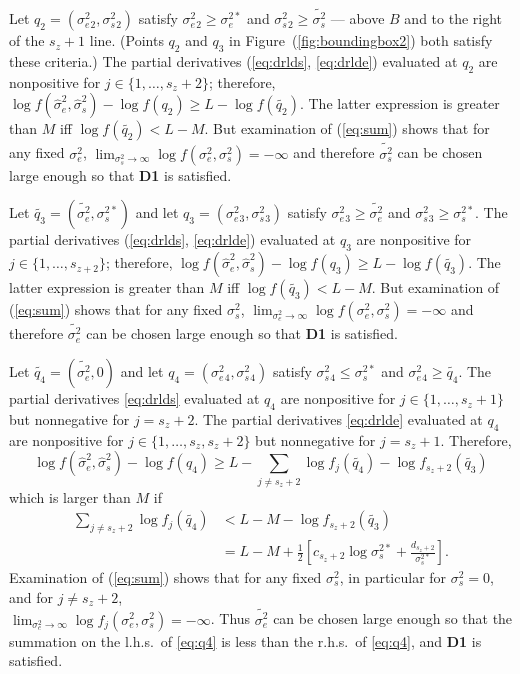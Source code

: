 \documentclass{report}
\newcommand{\RL}{f}
\newcommand{\logRL}{\log\RL}
\newcommand{\sigssq}{\sigma_s^2}
\newcommand{\sigesq}{\sigma_e^2}
\newcommand{\sshat}{\hat\sigma^2_e,\hat\sigma^2_s}
\newcommand{\logRLss}{\logRL(\sigesq,\sigssq)}
\begin{document}
Let $q_2 = (\sigesq{}_2, \sigssq{}_2)$ satisfy $\sigesq{}_2 \ge \sigma_e^{2*}$ and $\sigssq{}_2 \ge \widetilde{\sigma_s^2}$ --- above $B$ and to the right of the $s_z+1$ line.  (Points $q_2$ and $q_3$ in Figure~(\ref{fig:boundingbox2}) both satisfy these criteria.)  The partial derivatives (\ref{eq:drlds}, \ref{eq:drlde}) evaluated at $q_2$ are nonpositive for $j \in \{1, \dots, s_z+2\}$; therefore, $\logRL(\sshat) - \logRL(q_2) \ge L - \logRL(\widetilde{q_2})$.  The latter expression is greater than $M$ iff $\logRL(\widetilde{q_2}) < L-M$.  But examination of (\ref{eq:sum}) shows that for any fixed $\sigesq$, $\lim_{\sigssq \rightarrow \infty} \logRLss = -\infty$ and therefore $\widetilde{\sigma_s^2}$ can be chosen large enough so that \textbf{D1} is satisfied.

Let $\widetilde{q_3} = (\widetilde{\sigma_e^2}, \sigma_s^{2*})$ and let $q_3 = (\sigesq{}_3, \sigssq{}_3)$ satisfy $\sigesq{}_3 \ge \widetilde{\sigma_e^2}$ and $\sigssq{}_3 \ge \sigma_s^{2*}$.  The partial derivatives (\ref{eq:drlds}, \ref{eq:drlde}) evaluated at $q_3$ are nonpositive for $j \in \{1, \dots, s_{z+2}\}$; therefore, $\logRL(\sshat) - \logRL(q_3) \ge L - \logRL(\widetilde{q_3})$.  The latter expression is greater than $M$ iff $\logRL(\widetilde{q_3}) < L-M$.  But examination of (\ref{eq:sum}) shows that for any fixed $\sigssq$, $\lim_{\sigesq \rightarrow \infty} \logRLss = -\infty$ and therefore $\widetilde{\sigma_e^2}$ can be chosen large enough so that \textbf{D1} is satisfied.

Let $\widetilde{q_4} = (\widetilde{\sigma_e^2},0)$ and let $q_4 = (\sigesq{}_4, \sigssq{}_4)$ satisfy $\sigssq{}_4 \le \sigma_s^{2*}$ and $\sigesq{}_4 \ge \widetilde{q_4}$.  The partial derivatives \eqref{eq:drlds} evaluated at $q_4$ are nonpositive for $j \in \{1, \dots, s_z+1\}$  but nonnegative for $j=s_z+2$.  The partial derivatives \eqref{eq:drlde} evaluated at $q_4$ are nonpositive for $j \in \{1, \dots, s_z, s_z+2\}$  but nonnegative for $j=s_z+1$. Therefore,
\begin{equation*}
	\logRL(\sshat) - \logRL(q_4) \ge L - \sum_{j \ne s_z+2} \logRL_j(\widetilde{q_4}) - \logRL_{s_z+2}(\widetilde{q_3})
\end{equation*}
which is larger than $M$ if
\begin{equation}
\label{eq:q4}
  \begin{split}
    \sum_{j \ne s_z+2} \logRL_j(\widetilde{q_4})
      &< L - M - \logRL_{s_z+2}(\widetilde{q_3})\\
      &= L - M + \frac{1}{2} \left[ c_{s_z+2}\log\sigma_s^{2*} + \frac{d_{s_z+2}}{\sigma_s^{2*}}\right].
  \end{split}
\end{equation}
Examination of (\ref{eq:sum}) shows that for any fixed $\sigssq$, in particular for $\sigssq=0$, and for $j \ne s_z+2$,\\ $\lim_{\sigesq \rightarrow \infty} \logRL_j(\sigesq,\sigssq) = -\infty$.  Thus $\widetilde{\sigma_e^2}$ can be chosen large enough so that the summation on the l.h.s.~of \eqref{eq:q4} is less than the r.h.s.~of \eqref{eq:q4}, and  \textbf{D1} is satisfied.
\end{document}

